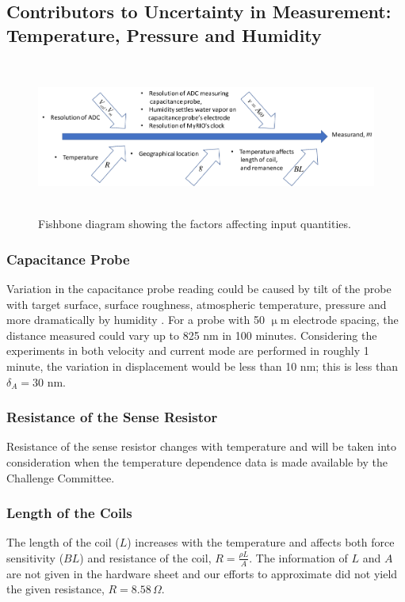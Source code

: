\documentclass[12pt]{article}
\begin{document}
\subsection{Contributors to Uncertainty in Measurement: Temperature, Pressure and Humidity}\label{sec:7.2}
\begin{figure}[ht!]
	\centering
	\includegraphics[height=2in]{fishbone}
	\caption{Fishbone diagram showing the factors affecting input quantities.}
	\label{fig:fishbone}
\end{figure}
\subsubsection{Capacitance Probe}
Variation in the capacitance probe reading could be caused by tilt of the probe with target surface, surface roughness, atmospheric temperature, pressure and more dramatically by humidity \cite{harmsen2010}. For a probe with 50 $\upmu$m electrode spacing, the distance measured could vary up to 825 nm in 100 minutes. Considering the experiments in both velocity and current mode are performed in roughly 1 minute, the variation in displacement would be less than 10 nm; this is less than $\delta_A=30$ nm.
\subsubsection{Resistance of the Sense Resistor}
Resistance of the sense resistor changes with temperature and will be taken into consideration when the temperature dependence data is made available by the Challenge Committee. 
\subsubsection{Length of the Coils}
The length of the coil ($L$) increases with the temperature and affects both force sensitivity ($BL$) and resistance of the coil, $R=\frac{\rho{L}}A$. The information of $L$ and $A$ are not given in the hardware sheet and our efforts to approximate did not yield the given resistance, $R=8.58\,\Omega$.
\end{document}
